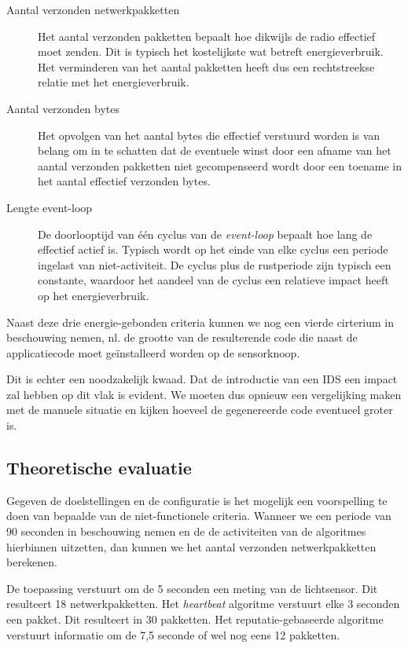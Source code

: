 \begin{description}
  
  \item[Aantal verzonden netwerkpakketten] Het aantal verzonden pakketten
  bepaalt hoe dikwijls de radio effectief moet zenden. Dit is typisch het
  kostelijkste wat betreft energieverbruik. Het verminderen van het aantal
  pakketten heeft dus een rechtstreekse relatie met het energieverbruik.

  \item[Aantal verzonden bytes] Het opvolgen van het aantal bytes die effectief
  verstuurd worden is van belang om in te schatten dat de eventuele winst door
  een afname van het aantal verzonden pakketten niet gecompenseerd wordt door
  een toename in het aantal effectief verzonden bytes.

  \item[Lengte event-loop] De doorlooptijd van \'e\'en cyclus van de
  \emph{event-loop} bepaalt hoe lang de \mcu effectief actief is. Typisch wordt
  op het einde van elke cyclus een periode ingelast van niet-activiteit. De
  cyclus plus de rustperiode zijn typisch een constante, waardoor het aandeel
  van de cyclus een relatieve impact heeft op het energieverbruik.
  
\end{description}

Naast deze drie energie-gebonden criteria kunnen we nog een vierde cirterium in
beschouwing nemen, nl. de grootte van de resulterende code die naast de
applicatiecode moet ge\"installeerd worden op de sensorknoop.

Dit is echter een noodzakelijk kwaad. Dat de introductie van een IDS een impact
zal hebben op dit vlak is evident. We moeten dus opnieuw een vergelijking maken
met de manuele situatie en kijken hoeveel de gegenereerde code eventueel groter
is.

\subsection{Theoretische evaluatie}

Gegeven de doelstellingen en de configuratie is het mogelijk een voorspelling
te doen van bepaalde van de niet-functionele criteria. Wanneer we een periode
van 90 seconden in beschouwing nemen en de de activiteiten van de algoritmes
hierbinnen uitzetten, dan kunnen we het aantal verzonden netwerkpakketten
berekenen.

De toepassing verstuurt om de 5 seconden een meting van de lichtsensor. Dit
resulteert 18 netwerkpakketten. Het \emph{heartbeat} algoritme verstuurt elke 3
seconden een pakket. Dit resulteert in 30 pakketten. Het reputatie-gebaseerde
algoritme verstuurt informatie om de 7,5 seconde of wel nog eens 12 pakketten.

